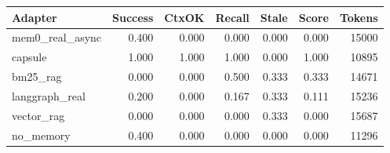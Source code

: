 \begin{tabular}{lrrrrrr}
\hline
Adapter & Success & CtxOK & Recall & Stale & Score & Tokens \\
\hline
mem0\_real\_async & 0.400 & 0.000 & 0.000 & 0.000 & 0.000 & 15000 \\
capsule & 1.000 & 1.000 & 1.000 & 0.000 & 1.000 & 10895 \\
bm25\_rag & 0.000 & 0.000 & 0.500 & 0.333 & 0.333 & 14671 \\
langgraph\_real & 0.200 & 0.000 & 0.167 & 0.333 & 0.111 & 15236 \\
vector\_rag & 0.000 & 0.000 & 0.000 & 0.333 & 0.000 & 15687 \\
no\_memory & 0.400 & 0.000 & 0.000 & 0.000 & 0.000 & 11296 \\
\hline
\end{tabular}

